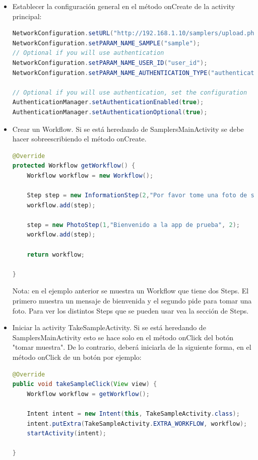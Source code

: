 \begin{itemize}
	\item Establecer la configuración general en el método onCreate de la activity principal:
		\begin{lstlisting}[language=Java, frame=tlb]
NetworkConfiguration.setURL("http://192.168.1.10/samplers/upload.php");
NetworkConfiguration.setPARAM_NAME_SAMPLE("sample");
// Optional if you will use authentication
NetworkConfiguration.setPARAM_NAME_USER_ID("user_id");
NetworkConfiguration.setPARAM_NAME_AUTHENTICATION_TYPE("authentication_type");

// Optional if you will use authentication, set the configuration
AuthenticationManager.setAuthenticationEnabled(true);
AuthenticationManager.setAuthenticationOptional(true);
		\end{lstlisting}

	\item Crear un Workflow. Si se está heredando de SamplersMainActivity se debe hacer sobreescribiendo el método onCreate.
		\begin{lstlisting}[language=Java, frame=tlb]
@Override
protected Workflow getWorkflow() {
	Workflow workflow = new Workflow();
    	
	Step step = new InformationStep(2,"Por favor tome una foto de su gato", null);
	workflow.add(step);
    	
	step = new PhotoStep(1,"Bienvenido a la app de prueba", 2);
	workflow.add(step);
    	
	return workflow;
    	
}		
		\end{lstlisting}
Nota: en el ejemplo anterior se muestra un Workflow que tiene dos Steps. El primero muestra un mensaje de bienvenida y el segundo pide para tomar una foto. Para ver los distintos Steps que se pueden usar vea la sección de Steps.

	\item Iniciar la activity TakeSampleActivity. Si se está heredando de SamplersMainActivity esto se hace solo en el método onClick del botón "tomar muestra". De lo contrario, deberá iniciarla de la siguiente forma, en el método onClick de un botón por ejemplo:
		\begin{lstlisting}[language=Java, frame=tlb]
@Override
public void takeSampleClick(View view) {
	Workflow workflow = getWorkflow();

	Intent intent = new Intent(this, TakeSampleActivity.class);        
	intent.putExtra(TakeSampleActivity.EXTRA_WORKFLOW, workflow);
	startActivity(intent);
    	
}		
		\end{lstlisting}




\end{itemize}


